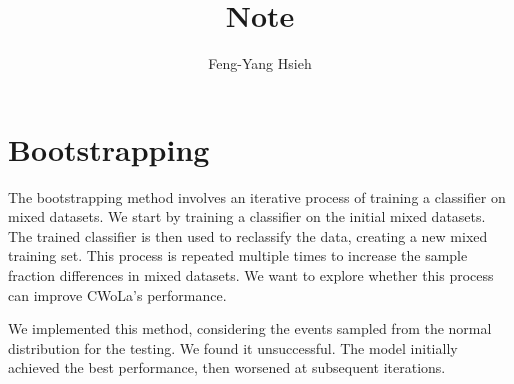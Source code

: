\documentclass[12pt]{article}
\title{Note}
\author{Feng-Yang Hsieh}
\date{}
\begin{document}
\maketitle


\section{Bootstrapping}%
\label{sec:bootstrapping}
    The bootstrapping method involves an iterative process of training a classifier on mixed datasets. We start by training a classifier on the initial mixed datasets. The trained classifier is then used to reclassify the data, creating a new mixed training set. This process is repeated multiple times to increase the sample fraction differences in mixed datasets. We want to explore whether this process can improve CWoLa's performance.
    
    We implemented this method, considering the events sampled from the normal distribution for the testing. We found it unsuccessful. The model initially achieved the best performance, then worsened at subsequent iterations.
\end{document}
